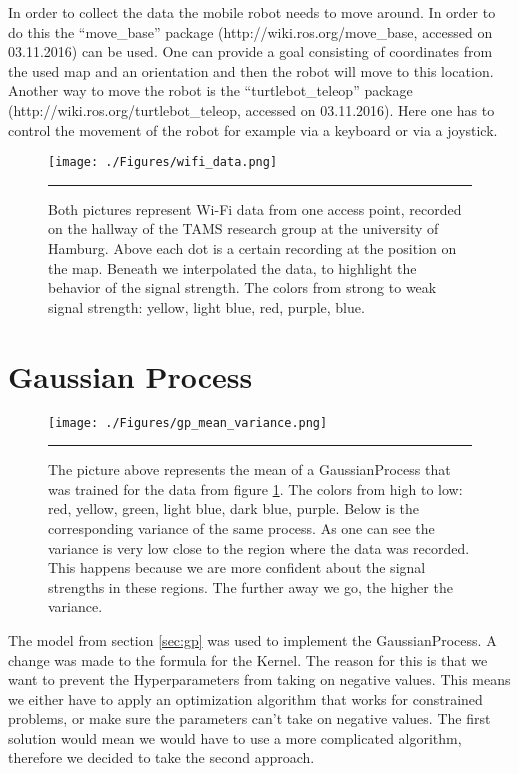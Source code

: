 In order to collect the data the mobile robot needs to move around. In order to do this the ``move\_base'' package (http://wiki.ros.org/move\_base, accessed on 03.11.2016) can be used. One can provide a goal consisting of coordinates from the used map and an orientation and then the robot will move to this location. Another way to move the robot is the ``turtlebot\_teleop'' package (http://wiki.ros.org/turtlebot\_teleop, accessed on 03.11.2016). Here one has to control the movement of the robot for example via a keyboard or via a joystick. 
\begin{figure}[htbp]
	\centering
		\texttt{[image: ./Figures/wifi\_data.png]}%
		\rule{35em}{0.5pt}
	\caption[Wi-Fi data]{Both pictures represent Wi-Fi data from one access point, recorded on the hallway of the TAMS research group at the university of Hamburg. Above each dot is a certain recording at the position on the map. Beneath we interpolated the data, to highlight the behavior of the signal strength. The colors from strong to weak signal strength: yellow, light blue, red, purple, blue.}
	\label{fig:wifi_data}
\end{figure}
 
\section{Gaussian Process}\label{sec:gausspr}

\begin{figure}[htbp]
	\centering
		\texttt{[image: ./Figures/gp\_mean\_variance.png]}%
		\rule{35em}{0.5pt}
	\caption[Wi-Fi data and the corresponding \Gls{GaussianProcess}]{The picture above represents the mean of a \Gls{GaussianProcess} that was trained for the data from figure \ref{fig:wifi_data}. The colors from high to low: red, yellow, green, light blue, dark blue, purple. Below is the corresponding variance of the same process. As one can see the variance is very low close to the region where the data was recorded. This happens because we are more confident about the signal strengths in these regions. The further away we go, the higher the variance.}
	\label{fig:gp_mean_var}
\end{figure}
The model from section \ref{sec:gp} was used to implement the \Gls{GaussianProcess}. A change was made to the formula for the \gls{Kernel}. The reason for this is that we want to prevent the \gls{Hyperparameter}s from taking on negative values. This means we either have to apply an optimization algorithm that works for constrained problems, or make sure the parameters can't take on negative values. The first solution would mean we would have to use a more complicated algorithm, therefore we decided to take the second approach. 

